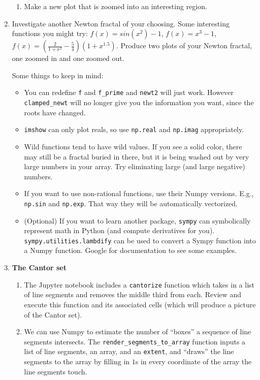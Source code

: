 \documentclass[letter]{article}
\begin{document}
\begin{enumerate}
\begin{enumerate}
				\item Make a new plot that is zoomed into an interesting region.
			\end{enumerate}
		\item Investigate another Newton fractal of your choosing. Some interesting functions you might try: $f(x)=sin(x^2)-1$,
			$f(x)=x^3-1$, $f(x)=(\tfrac{2}{1+x^2}-\tfrac{5}{4})(1+x^{1.5})$. Produce two plots of your Newton fractal, one zoomed
			in and one zoomed out.

			Some things to keep in mind: \begin{itemize}
				\item You can redefine \verb|f| and \verb|f_prime| and \verb|newt2| will just work.
			However \verb|clamped_newt| will no longer give you the information you want, since the roots have changed. 
				\item {\tt imshow} can only plot reals, so use {\tt np.real} and {\tt np.imag} appropriately.
				\item Wild functions tend to have wild values. If you see a solid color, there may still be a fractal buried in there,
				but it is being washed out by very large numbers in your array. Try eliminating large (and large negative) numbers.
				\item If you want to use non-rational functions, use their Numpy versions. E.g., {\tt np.sin} and {\tt np.exp}.
					That way they will be automatically vectorized.
				\item (Optional) If you want to learn another package, {\tt sympy} can symbolically represent math in Python (and
					compute derivatives for you). {\tt sympy.utilities.lambdify} can be used to convert a Sympy
					function into a Numpy function. Google for documentation to see some examples.
			\end{itemize}
		\item {\bf The Cantor set} 
			\begin{enumerate}
				\item The Jupyter notebook includes a \verb|cantorize| function which takes in a list
				of line segments and removes the middle third from each. Review and execute this function and its associated cells
				(which will produce a picture of the Cantor set).
				\item We can use Numpy to estimate the number of ``boxes'' a sequence of line segments intersects.
					The \verb|render_segments_to_array| function inputs a list of line segments, an array,
					and an \verb|extent|, and ``draws'' the line segments to the array by filling in $1$s
					in every coordinate of the array the line segments touch.


\end{enumerate}
\end{enumerate}
\end{document}
